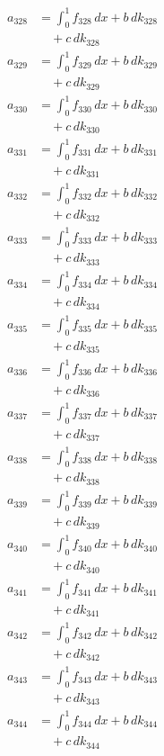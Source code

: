 \documentclass{article}
\begin{document}
\begin{align}
a_{328} &= \int_0^1 f_{328}\,dx + b\,dk_{328} \\
&\quad + c\,dk_{328} \\
a_{329} &= \int_0^1 f_{329}\,dx + b\,dk_{329} \\
&\quad + c\,dk_{329} \\
a_{330} &= \int_0^1 f_{330}\,dx + b\,dk_{330} \\
&\quad + c\,dk_{330} \\
a_{331} &= \int_0^1 f_{331}\,dx + b\,dk_{331} \\
&\quad + c\,dk_{331} \\
a_{332} &= \int_0^1 f_{332}\,dx + b\,dk_{332} \\
&\quad + c\,dk_{332} \\
a_{333} &= \int_0^1 f_{333}\,dx + b\,dk_{333} \\
&\quad + c\,dk_{333} \\
a_{334} &= \int_0^1 f_{334}\,dx + b\,dk_{334} \\
&\quad + c\,dk_{334} \\
a_{335} &= \int_0^1 f_{335}\,dx + b\,dk_{335} \\
&\quad + c\,dk_{335} \\
a_{336} &= \int_0^1 f_{336}\,dx + b\,dk_{336} \\
&\quad + c\,dk_{336} \\
a_{337} &= \int_0^1 f_{337}\,dx + b\,dk_{337} \\
&\quad + c\,dk_{337} \\
a_{338} &= \int_0^1 f_{338}\,dx + b\,dk_{338} \\
&\quad + c\,dk_{338} \\
a_{339} &= \int_0^1 f_{339}\,dx + b\,dk_{339} \\
&\quad + c\,dk_{339} \\
a_{340} &= \int_0^1 f_{340}\,dx + b\,dk_{340} \\
&\quad + c\,dk_{340} \\
a_{341} &= \int_0^1 f_{341}\,dx + b\,dk_{341} \\
&\quad + c\,dk_{341} \\
a_{342} &= \int_0^1 f_{342}\,dx + b\,dk_{342} \\
&\quad + c\,dk_{342} \\
a_{343} &= \int_0^1 f_{343}\,dx + b\,dk_{343} \\
&\quad + c\,dk_{343} \\
a_{344} &= \int_0^1 f_{344}\,dx + b\,dk_{344} \\
&\quad + c\,dk_{344} \\

\end{align}
\end{document}
